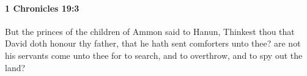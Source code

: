 
		\paragraph{1 Chronicles 19:3} %
			\label{1CHRONICLES-19-3}

			But the princes of the children of Ammon said to Hanun, Thinkest thou that David doth honour thy father, that he hath sent comforters unto thee? are not his servants come unto thee for to search, and to overthrow, and to spy out the land?


